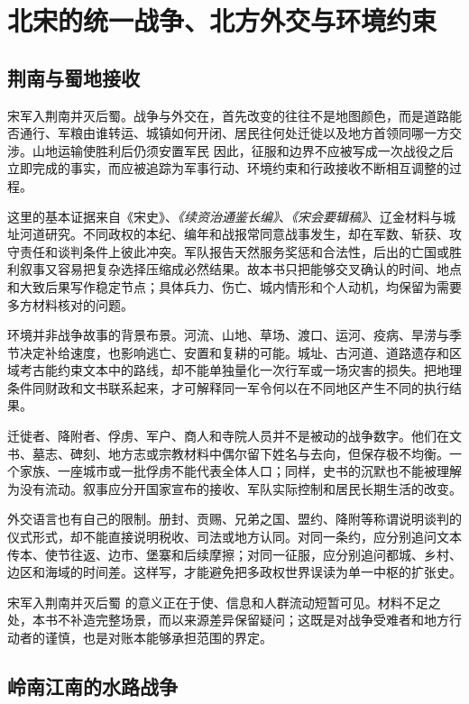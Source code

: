 \section{北宋的统一战争、北方外交与环境约束}

\subsection{荆南与蜀地接收}

宋军入荆南并灭后蜀。战争与外交在，首先改变的往往不是地图颜色，而是道路能否通行、军粮由谁转运、城镇如何开闭、居民往何处迁徙以及地方首领同哪一方交涉。山地运输使胜利后仍须安置军民 因此，征服和边界不应被写成一次战役之后立即完成的事实，而应被追踪为军事行动、环境约束和行政接收不断相互调整的过程。

这里的基本证据来自《宋史》、\textit{《续资治通鉴长编》}、\textit{《宋会要辑稿》}、辽金材料与城址河道研究。不同政权的本纪、编年和战报常同意战事发生，却在军数、斩获、攻守责任和谈判条件上彼此冲突。军队报告天然服务奖惩和合法性，后出的亡国或胜利叙事又容易把复杂选择压缩成必然结果。故本书只把能够交叉确认的时间、地点和大致后果写作稳定节点；具体兵力、伤亡、城内情形和个人动机，均保留为需要多方材料核对的问题。

环境并非战争故事的背景布景。河流、山地、草场、渡口、运河、疫病、旱涝与季节决定补给速度，也影响逃亡、安置和复耕的可能。城址、古河道、道路遗存和区域考古能约束文本中的路线，却不能单独量化一次行军或一场灾害的损失。把地理条件同财政和文书联系起来，才可解释同一军令何以在不同地区产生不同的执行结果。

迁徙者、降附者、俘虏、军户、商人和寺院人员并不是被动的战争数字。他们在文书、墓志、碑刻、地方志或宗教材料中偶尔留下姓名与去向，但保存极不均衡。一个家族、一座城市或一批俘虏不能代表全体人口；同样，史书的沉默也不能被理解为没有流动。叙事应分开国家宣布的接收、军队实际控制和居民长期生活的改变。

外交语言也有自己的限制。册封、贡赐、兄弟之国、盟约、降附等称谓说明谈判的仪式形式，却不能直接说明税收、司法或地方认同。对同一条约，应分别追问文本传本、使节往返、边市、堡寨和后续摩擦；对同一征服，应分别追问都城、乡村、边区和海域的时间差。这样写，才能避免把多政权世界误读为单一中枢的扩张史。

宋军入荆南并灭后蜀 的意义正在于使、信息和人群流动短暂可见。材料不足之处，本书不补造完整场景，而以来源差异保留疑问；这既是对战争受难者和地方行动者的谨慎，也是对账本能够承担范围的界定。

\subsection{岭南江南的水路战争}

